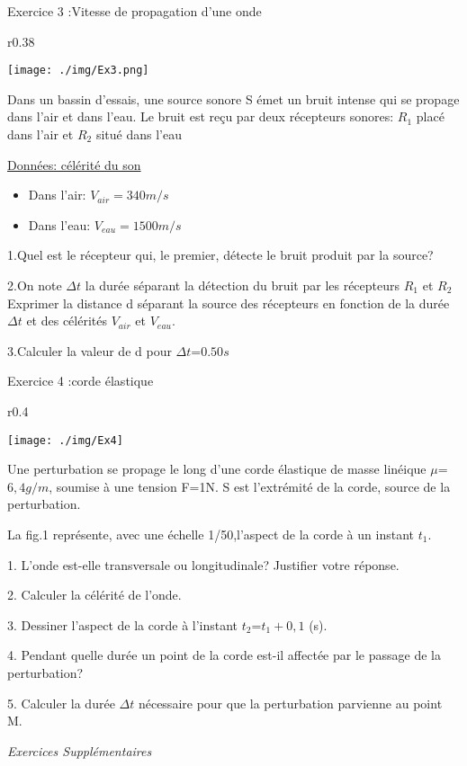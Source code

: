\documentclass[12pt, french]{article}
\begin{document}
\begin{Box2}{Exercice 3 :Vitesse de propagation d’une onde }
\begin{wrapfigure}{r}{0.38\textwidth}
  \begin{center}
	\texttt{[image: ./img/Ex3.png]}
  \end{center}
\end{wrapfigure}
Dans un bassin d’essais, une source sonore S émet un bruit intense qui se propage dans l’air et dans l’eau. Le bruit est reçu par deux récepteurs sonores: $R_1$ placé dans l’air et $R_2$ situé dans l’eau

\underline{Données: célérité du son }
\begin{itemize}
	\item Dans l’air: $V_{air} = 340m/s$
	\item Dans l’eau: $V_{eau} = 1500m/s$
\end{itemize}
1.Quel est le récepteur qui, le premier, détecte le bruit produit par la source?

2.On note $\Delta{t}$ la durée séparant la détection du bruit par les récepteurs $R_1$ et $R_2$
Exprimer la distance d séparant la source des récepteurs en fonction de la durée $\Delta{t}$ et des célérités $V_{air}$ et $V_{eau}$.

3.Calculer la valeur de d pour $\Delta{t}$=$0.50s$
\end{Box2}

\begin{Box2}{Exercice 4 :corde élastique }
\begin{wrapfigure}{r}{0.4\textwidth}
  \begin{center}
	  \vspace{-0.6cm}
	\texttt{[image: ./img/Ex4]}
  \end{center}
\end{wrapfigure}
Une perturbation se propage le long d’une corde élastique de masse linéique $\mu$=$6,4g/m$, soumise  à une tension F=1N. S est l’extrémité de la corde, source de la
perturbation.

La fig.1 représente, avec une échelle 1/50,l’aspect de la corde à un instant $t_1$.

1. L’onde est-elle transversale ou longitudinale? Justifier votre réponse.

2. Calculer la célérité de l’onde.

3. Dessiner l’aspect de la corde à l’instant $t_2$=$t_1 + 0,1$ (s).

4. Pendant quelle durée un point de la corde est-il affectée par le passage de la perturbation?

5. Calculer la durée $\Delta{t}$ nécessaire pour que la perturbation parvienne au point M.


\end{Box2}
\begin{center}
   \Large{ \em{Exercices Supplémentaires}}
\end{center}
\end{document}
